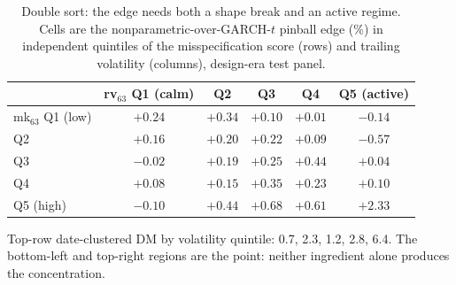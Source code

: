 \documentclass[11pt]{article}
\theoremstyle{remark}
\begin{document}
\begin{table}[tp]
\centering
\begin{threeparttable}
\caption{Double sort: the edge needs both a shape break and an active
regime. Cells are the nonparametric-over-GARCH-$t$ pinball edge (\%)
in independent quintiles of the misspecification score (rows) and
trailing volatility (columns), design-era test panel.}
\label{tab:doublesort}
\footnotesize\setlength{\tabcolsep}{5pt}
\begin{tabular}{lccccc}
\toprule
 & rv$_{63}$ Q1 (calm) & Q2 & Q3 & Q4 & Q5 (active) \\
\midrule
mk$_{63}$ Q1 (low) & $+0.24$ & $+0.34$ & $+0.10$ & $+0.01$ & $-0.14$ \\
Q2 & $+0.16$ & $+0.20$ & $+0.22$ & $+0.09$ & $-0.57$ \\
Q3 & $-0.02$ & $+0.19$ & $+0.25$ & $+0.44$ & $+0.04$ \\
Q4 & $+0.08$ & $+0.15$ & $+0.35$ & $+0.23$ & $+0.10$ \\
Q5 (high) & $-0.10$ & $+0.44$ & $+0.68$ & $+0.61$ & $\mathbf{+2.33}$ \\
\bottomrule
\end{tabular}
\begin{tablenotes}\footnotesize
\item Top-row date-clustered DM by volatility quintile: 0.7, 2.3, 1.2,
2.8, 6.4. The bottom-left and top-right regions are the point:
neither ingredient alone produces the concentration.
\end{tablenotes}
\end{threeparttable}
\end{table}
\end{document}

